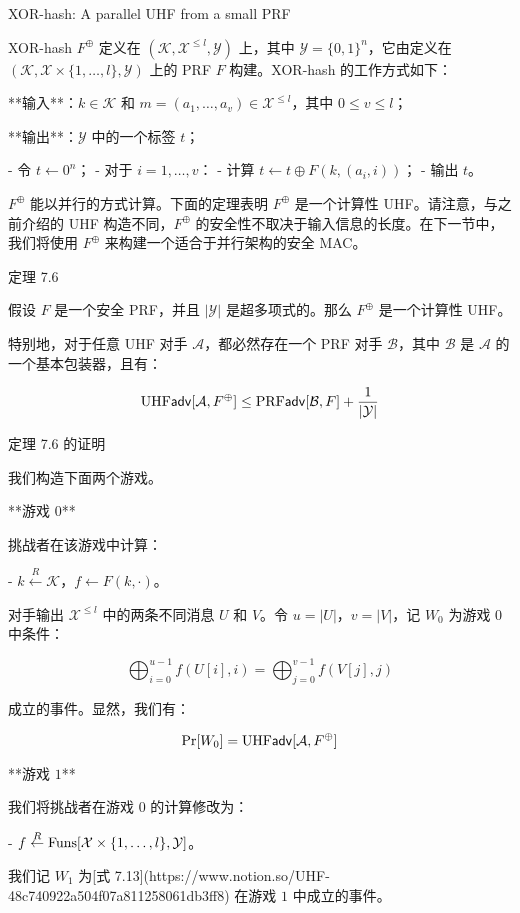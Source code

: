 XOR-hash: A parallel UHF from a small PRF

XOR-hash $F^\oplus$ 定义在 $(\mathcal{K},\mathcal{X}^{\leq l},\mathcal{Y})$ 上，其中 $\mathcal{Y}=\{0,1\}^n$，它由定义在 $(\mathcal{K},\mathcal{X}\times\{1,\dots,l\},\mathcal{Y})$ 上的 PRF $F$ 构建。XOR-hash 的工作方式如下：

**输入**：$k\in\mathcal{K}$ 和 $m=(a_1,\dots,a_v)\in\mathcal{X}^{\leq l}$，其中 $0\leq v\leq l$；

**输出**：$\mathcal{Y}$ 中的一个标签 $t$；

- 令 $t\leftarrow0^n$；
- 对于 $i=1,\dots,v$：
    - 计算 $t\leftarrow t\oplus F(k,(a_i,i))$；
- 输出 $t$。

$F^\oplus$ 能以并行的方式计算。下面的定理表明 $F^\oplus$ 是一个计算性 UHF。请注意，与之前介绍的 UHF 构造不同，$F^\oplus$ 的安全性不取决于输入信息的长度。在下一节中，我们将使用 $F^\oplus$ 来构建一个适合于并行架构的安全 MAC。

定理 7.6

假设 $F$ 是一个安全 PRF，并且 $|\mathcal{Y}|$ 是超多项式的。那么 $F^\oplus$ 是一个计算性 UHF。

特别地，对于任意 UHF 对手 $\mathcal{A}$，都必然存在一个 PRF 对手 $\mathcal{B}$，其中 $\mathcal{B}$ 是 $\mathcal{A}$ 的一个基本包装器，且有：

$$
{\rm UHF}\mathsf{adv}[\mathcal{A},F^\oplus]\leq{\rm PRF}\mathsf{adv}[\mathcal{B},F]+\frac{1}{|\mathcal{Y}|}
$$

定理 7.6 的证明

我们构造下面两个游戏。

**游戏 $0$**

挑战者在该游戏中计算：

- $k\overset{R}\leftarrow\mathcal{K}$，$f\leftarrow F(k,\cdot)$。

对手输出 $\mathcal{X}^{\leq l}$ 中的两条不同消息 $U$ 和 $V$。令 $u=|U|$，$v=|V|$，记 $W_0$ 为游戏 $0$ 中条件：

$$
\bigoplus_{i=0}^{u-1}f(U[i],i)=\bigoplus_{j=0}^{v-1}f(V[j],j)
$$

成立的事件。显然，我们有：

$$
\Pr[W_0]={\rm UHF}\mathsf{adv}[\mathcal{A},F^\oplus]
$$

**游戏 $1$**

我们将挑战者在游戏 $0$ 的计算修改为：

- $f\overset{R}\leftarrow{\rm Funs}[\mathcal{X}\times\{1,\dots,l\},\mathcal{Y}]$。

我们记 $W_1$ 为[式 7.13](https://www.notion.so/UHF-48c740922a504f07a811258061db3ff8) 在游戏 $1$ 中成立的事件。


